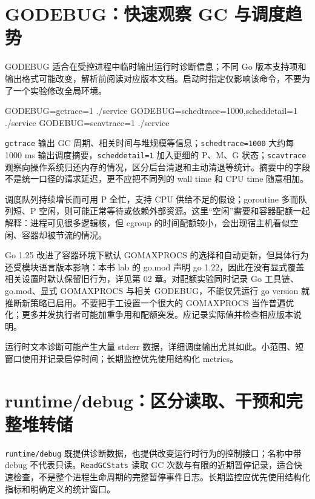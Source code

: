 \documentclass[UTF8,fontset=fandol,openany,11pt]{ctexbook}
\begin{document}
\section{GODEBUG：快速观察 GC 与调度趋势}
GODEBUG 适合在受控进程中临时输出运行时诊断信息；不同 Go 版本支持项和输出格式可能改变，解析前阅读对应版本文档。启动时指定仅影响该命令，不要为了一个实验修改全局环境。

\begin{codeblock}
GODEBUG=gctrace=1 ./service
GODEBUG=schedtrace=1000,scheddetail=1 ./service
GODEBUG=scavtrace=1 ./service
\end{codeblock}

\texttt{gctrace} 输出 GC 周期、相关时间与堆规模等信息；\texttt{schedtrace=1000} 大约每 1000 ms 输出调度摘要，\texttt{scheddetail=1} 加入更细的 P、M、G 状态；\texttt{scavtrace} 观察向操作系统归还内存的情况，区分后台清退和主动清退等统计。摘要中的字段不是统一口径的请求延迟，更不应把不同列的 wall time 和 CPU time 随意相加。\cite{tools-runtime-debug}

调度队列持续增长而可用 P 全忙，支持 CPU 供给不足的假设；goroutine 多而队列短、P 空闲，则可能正常等待或依赖外部资源。这里“空闲”需要和容器配额一起解释：进程可见很多逻辑核，但 cgroup 的时间配额较小，会出现宿主机看似空闲、容器却被节流的情况。

Go 1.25 改进了容器环境下默认 GOMAXPROCS 的选择和自动更新，但具体行为还受模块语言版本影响：本书 lab 的 go.mod 声明 go 1.22，因此在没有显式覆盖相关设置时默认保留旧行为，详见第 02 章。对配额实验同时记录 Go 工具链、go.mod、显式 GOMAXPROCS 与相关 GODEBUG，不能仅凭运行 go version 就推断新策略已启用。不要把手工设置一个很大的 GOMAXPROCS 当作普遍优化；更多并发执行者可能加重争用和配额突发。应记录实际值并检查相应版本说明。\cite{tools-go125}

运行时文本诊断可能产生大量 stderr 数据，详细调度输出尤其如此。小范围、短窗口使用并记录启停时间；长期监控优先使用结构化 metrics。

\section{runtime/debug：区分读取、干预和完整堆转储}
\texttt{runtime/\allowbreak{}debug} 既提供诊断数据，也提供改变运行时行为的控制接口；名称中带 debug 不代表只读。\texttt{ReadGCStats} 读取 GC 次数与有限的近期暂停记录，适合快速检查，不是整个进程生命周期的完整暂停事件日志。长期监控应优先使用结构化指标和明确定义的统计窗口。\cite{tools-runtime-debug-api}
\end{document}
